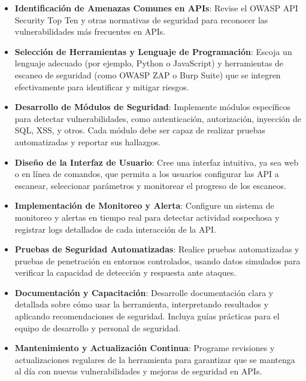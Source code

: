 \documentclass{article}
\begin{document}
    \begin{itemize}
        \item \textbf{Identificación de Amenazas Comunes en APIs}: Revise el OWASP API Security Top Ten y otras normativas de seguridad para reconocer las vulnerabilidades más frecuentes en APIs.
        \item \textbf{Selección de Herramientas y Lenguaje de Programación}: Escoja un lenguaje adecuado (por ejemplo, Python o JavaScript) y herramientas de escaneo de seguridad (como OWASP ZAP o Burp Suite) que se integren efectivamente para identificar y mitigar riesgos.
        \item \textbf{Desarrollo de Módulos de Seguridad}: Implemente módulos específicos para detectar vulnerabilidades, como autenticación, autorización, inyección de SQL, XSS, y otros. Cada módulo debe ser capaz de realizar pruebas automatizadas y reportar sus hallazgos.
        \item \textbf{Diseño de la Interfaz de Usuario}: Cree una interfaz intuitiva, ya sea web o en línea de comandos, que permita a los usuarios configurar las API a escanear, seleccionar parámetros y monitorear el progreso de los escaneos.
        \item \textbf{Implementación de Monitoreo y Alerta}: Configure un sistema de monitoreo y alertas en tiempo real para detectar actividad sospechosa y registrar logs detallados de cada interacción de la API.
        \item \textbf{Pruebas de Seguridad Automatizadas}: Realice pruebas automatizadas y pruebas de penetración en entornos controlados, usando datos simulados para verificar la capacidad de detección y respuesta ante ataques.
        \item \textbf{Documentación y Capacitación}: Desarrolle documentación clara y detallada sobre cómo usar la herramienta, interpretando resultados y aplicando recomendaciones de seguridad. Incluya guías prácticas para el equipo de desarrollo y personal de seguridad.
        \item \textbf{Mantenimiento y Actualización Continua}: Programe revisiones y actualizaciones regulares de la herramienta para garantizar que se mantenga al día con nuevas vulnerabilidades y mejoras de seguridad en APIs.        
    \end{itemize}
\end{document}
